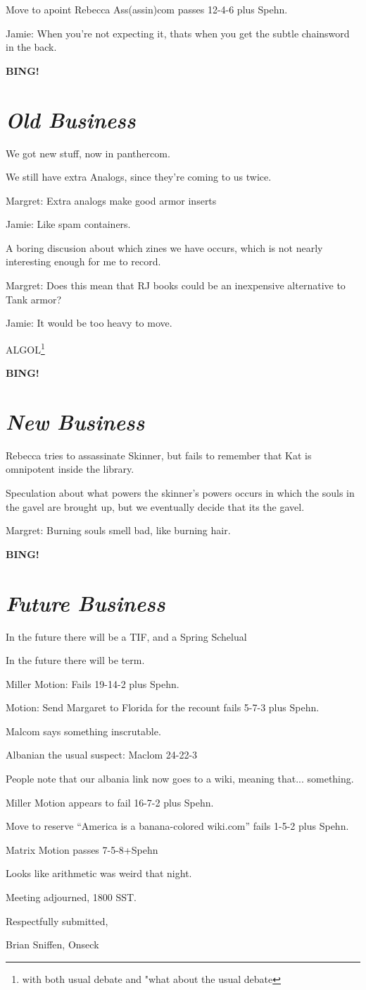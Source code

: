 \documentclass[10pt]{article}
\newcommand{\bing}{{\bf BING!} }
\newcommand{\goto}[1]{\bing \vskip 12pt \section*{{\em{#1}}}}
\newcommand{\ps}{ plus Spehn\xspace}
\begin{document}
Move to apoint Rebecca Ass(assin)com passes 12-4-6\ps.

Jamie: When you're not expecting it, thats when you get the subtle
chainsword in the back.

\goto{Old Business}

We got new stuff, now in panthercom.

We still have extra Analogs, since they're coming to us twice.

Margret: Extra analogs make good armor inserts

Jamie: Like spam containers.

A boring discusion about which zines we have occurs, which is not
nearly interesting enough for me to record.

Margret: Does this mean that RJ books could be an inexpensive
alternative to Tank armor?

Jamie: It would be too heavy to move.

ALGOL\footnote{with both usual debate and "what about the usual
  debate}

\goto{New Business}

Rebecca tries to assassinate Skinner, but fails to remember that Kat
is omnipotent inside the library.

Speculation about what powers the skinner's powers occurs in which
the souls in the gavel are brought up, but we eventually decide that
its the gavel.

Margret: Burning souls smell bad, like burning hair.

\goto{Future Business}

In the future there will be a TIF, and a Spring Schelual

In the future there will be term.

Miller Motion: Fails 19-14-2\ps.

Motion:  Send Margaret to Florida for the recount fails 5-7-3\ps.

Malcom says something inscrutable.

Albanian the usual suspect:  Maclom 24-22-3

People note that our albania link now goes to a wiki, meaning that... something.

Miller Motion appears to fail 16-7-2\ps.

Move to reserve ``America is a banana-colored wiki.com'' fails  1-5-2\ps.

Matrix Motion passes 7-5-8+Spehn

Looks like arithmetic was weird that night.

\vspace{12pt}

\noindent
Meeting adjourned, 1800 SST.

\vspace{18pt}

\centerline{Respectfully submitted,}
\centerline{Brian Sniffen, Onseck}
\end{document}
